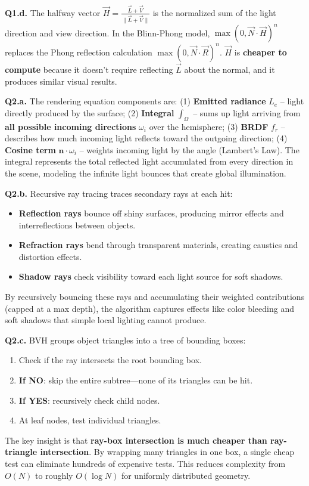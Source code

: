 \documentclass[11pt]{article}
\begin{document}
\vspace{0.75em}
\textbf{Q1.d.} The halfway vector $\vec{H} = \frac{\vec{L}+\vec{V}}{\|\vec{L}+\vec{V}\|}$ is the normalized sum of the light direction and view direction. In the Blinn-Phong model, $\max(0, \vec{N}\cdot\vec{H})^n$ replaces the Phong reflection calculation $\max(0, \vec{N}\cdot\vec{R})^n$. $\vec{H}$ is \textbf{cheaper to compute} because it doesn't require reflecting $\vec{L}$ about the normal, and it produces similar visual results.

\vspace{1em}

\textbf{Q2.a.} The rendering equation components are:
(1) \textbf{Emitted radiance} $L_e$ – light directly produced by the surface;
(2) \textbf{Integral} $\int_\Omega$ – sums up light arriving from \textbf{all possible incoming directions} $\omega_i$ over the hemisphere;
(3) \textbf{BRDF} $f_r$ – describes how much incoming light reflects toward the outgoing direction;
(4) \textbf{Cosine term} $\mathbf{n}\cdot\omega_i$ – weights incoming light by the angle (Lambert's Law).
The integral represents the total reflected light accumulated from every direction in the scene, modeling the infinite light bounces that create global illumination.

\vspace{0.75em}
\textbf{Q2.b.} Recursive ray tracing traces secondary rays at each hit:
\begin{itemize}[leftmargin=2em, nosep]
\item \textbf{Reflection rays} bounce off shiny surfaces, producing mirror effects and interreflections between objects.
\item \textbf{Refraction rays} bend through transparent materials, creating caustics and distortion effects.
\item \textbf{Shadow rays} check visibility toward each light source for soft shadows.
\end{itemize}
By recursively bouncing these rays and accumulating their weighted contributions (capped at a max depth), the algorithm captures effects like color bleeding and soft shadows that simple local lighting cannot produce.

\vspace{0.75em}
\textbf{Q2.c.} BVH groups object triangles into a tree of bounding boxes:
\begin{enumerate}[leftmargin=2em, nosep]
\item Check if the ray intersects the root bounding box.
\item \textbf{If NO}: skip the entire subtree—none of its triangles can be hit.
\item \textbf{If YES}: recursively check child nodes.
\item At leaf nodes, test individual triangles.
\end{enumerate}
The key insight is that \textbf{ray-box intersection is much cheaper than ray-triangle intersection}. By wrapping many triangles in one box, a single cheap test can eliminate hundreds of expensive tests. This reduces complexity from $O(N)$ to roughly $O(\log N)$ for uniformly distributed geometry.
\end{document}
